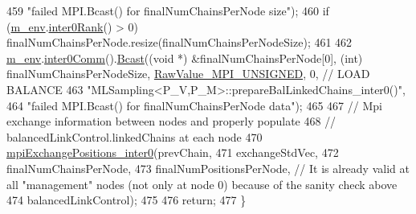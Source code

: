 \begin{DoxyCode}
459                            \textcolor{stringliteral}{"failed MPI.Bcast() for finalNumChainsPerNode size"});
460   \textcolor{keywordflow}{if} (\hyperlink{class_q_u_e_s_o_1_1_m_l_sampling_a13f1ca4fe9f94822fe572a743eaced1d}{m\_env}.\hyperlink{class_q_u_e_s_o_1_1_base_environment_ae106b5bb8a80b655b88b3a26b1e7c185}{inter0Rank}() > 0) finalNumChainsPerNode.resize(finalNumChainsPerNodeSize);
461 
462   \hyperlink{class_q_u_e_s_o_1_1_m_l_sampling_a13f1ca4fe9f94822fe572a743eaced1d}{m\_env}.\hyperlink{class_q_u_e_s_o_1_1_base_environment_a689e4d140c74d495d97eb498714a4b82}{inter0Comm}().\hyperlink{class_q_u_e_s_o_1_1_mpi_comm_abd6af8db8b0c7fd2f5b62e26477a9537}{Bcast}((\textcolor{keywordtype}{void} *) &finalNumChainsPerNode[0], (\textcolor{keywordtype}{int}) 
      finalNumChainsPerNodeSize, \hyperlink{_mpi_comm_8h_a06cbfbc33436f6e0dc8a48ff3c49bdfc}{RawValue\_MPI\_UNSIGNED}, 0, \textcolor{comment}{// LOAD BALANCE}
463                            \textcolor{stringliteral}{"MLSampling<P\_V,P\_M>::prepareBalLinkedChains\_inter0()"},
464                            \textcolor{stringliteral}{"failed MPI.Bcast() for finalNumChainsPerNode data"});
465 
467   \textcolor{comment}{// Mpi exchange information between nodes and properly populate}
468   \textcolor{comment}{// balancedLinkControl.linkedChains at each node}
470 \textcolor{comment}{}  \hyperlink{class_q_u_e_s_o_1_1_m_l_sampling_a1bb275df38553b88e2196103c7f5ea46}{mpiExchangePositions\_inter0}(prevChain,
471                               exchangeStdVec,
472                               finalNumChainsPerNode,
473                               finalNumPositionsPerNode, \textcolor{comment}{// It is already valid at all "management" nodes
       (not only at node 0) because of the sanity check above}
474                               balancedLinkControl);
475 
476   \textcolor{keywordflow}{return};
477 \}
\end{DoxyCode}

